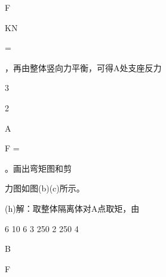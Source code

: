 \documentclass[UTF8,12pt,a4paper,openany]{ctexbook}
\begin{document}
\begin{enumerate}[label=\textbf{\arabic*.},leftmargin=2em]
\par F\par KN\par =\par ，再由整体竖向力平衡，可得A处支座反力\par 3\par 2\par A\par F =\par 。画出弯矩图和剪\par 力图如图(b)(c)所示。\par (h)解：取整体隔离体对A点取矩，由\par 6 10 6 3 250 2 250 4\par B\par F \textbacksl
\end{enumerate}
\end{document}
